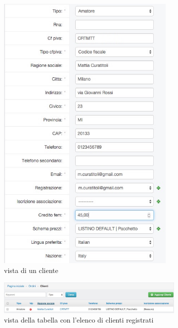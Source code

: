 \begin{figure}
\begin{subfigure}[b]{0.29\textwidth}
   \includegraphics[width=0.95\textwidth]{images/admin-cliente} 
   \caption{vista di un cliente}
   \label{fig:admin-cliente}
 \end{subfigure}
 \begin{subfigure}[b]{1\textwidth}
   \includegraphics[width=\textwidth]{images/admin-cliente-tab}
   \caption{vista della tabella con l'elenco di clienti registrati}
   \label{fig:admin-cliente-tab}
 \end{subfigure}
 \begin{subfigure}[b]{0.6\textwidth}

\end{subfigure}
\end{figure}
